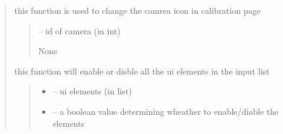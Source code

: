 \documentclass[letterpaper,10pt,english]{sphinxmanual}
\begin{document}
\begin{quote}
\begin{savenotes}
\begin{fulllineitems}

\begin{savenotes}\begin{fulllineitems}
\label{\detokenize{setting/setting_UI:oxin.setting_UI.UI_main_window.selected_camera}}
\pysigstartsignatures
{}
\pysigstopsignatures
\sphinxAtStartPar
this function is used to change the camrea icon in calibration page
\begin{quote}\begin{description}
\sphinxAtStartPar
{} – id of camera (in int)

\sphinxAtStartPar
None

\end{description}\end{quote}

\end{fulllineitems}\end{savenotes}


\begin{savenotes}\begin{fulllineitems}
\label{\detokenize{setting/setting_UI:oxin.setting_UI.UI_main_window.set_button_enable_or_disable}}
\pysigstartsignatures
{}
\pysigstopsignatures
\sphinxAtStartPar
this function will enable or disble all the ui elements in the input list
\begin{quote}\begin{description}
\begin{itemize}
\item {} 
\sphinxAtStartPar
{} – ui elements (in list)

\item {} 
\sphinxAtStartPar
{} – a boolean value determining wheather to enable/diable the elements


\end{itemize}
\end{description}
\end{quote}
\end{fulllineitems}
\end{savenotes}
\end{fulllineitems}
\end{savenotes}
\end{quote}
\end{document}
